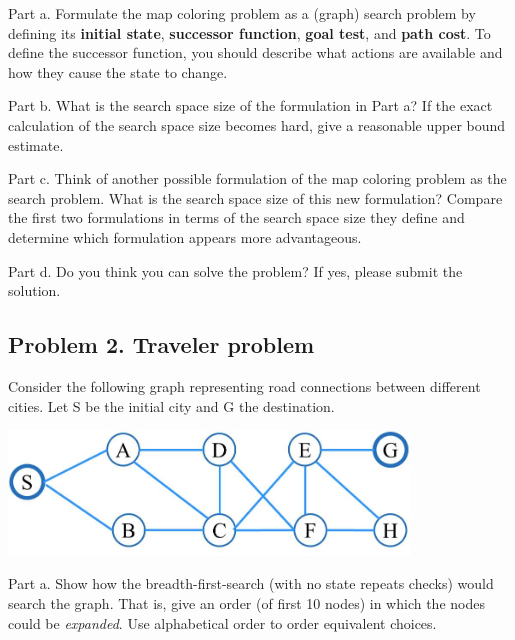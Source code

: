 \documentclass[11pt]{article}
\begin{document}
Part a. Formulate the map coloring problem as a (graph) search problem by defining its \textbf{initial state}, \textbf{successor function}, \textbf{goal test}, and \textbf{path cost}. To define the successor function, you should describe what actions are available and how they cause the state to change. 

\vspace{2cm} %

Part b. What is the search space size of the formulation in Part a? If the exact calculation of the search space size becomes hard, give a reasonable upper bound estimate. 

\vspace{2cm} %

Part c. Think of another possible formulation of the map coloring problem as the search problem. What is the search space size of this new formulation? Compare the first two formulations in terms of the search space size they define and determine which formulation appears more advantageous.

\vspace{2cm} %

Part d. Do you think you can solve the problem? If yes, please submit the solution. 

\vspace{2cm} %

\clearpage
\subsection*{Problem 2. Traveler problem}

Consider the following graph representing road connections
between different cities. Let S be the initial city and G the destination.
\begin{center}
	\includegraphics[width=0.8\textwidth]{./search_map_2.jpg}
\end{center}

Part a. Show how the breadth-first-search (with no state repeats checks) would search the
graph. That is, give an order (of first 10 nodes) in which the nodes could be {\em{expanded}}. Use alphabetical order to order equivalent choices. 
\end{document}

